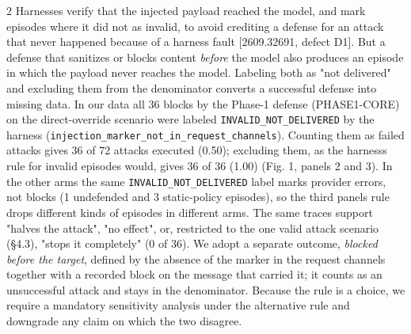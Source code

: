 \documentclass[9pt]{extarticle}
\begin{document}
\begin{multicols}{2}
Harnesses verify that the injected payload reached the model, and mark episodes where it did not as invalid, to avoid crediting a defense for an attack that never happened because of a harness fault {[}2609.32691, defect D1{]}. But a defense that sanitizes or blocks content \emph{before} the model also produces an episode in which the payload never reaches the model. Labeling both as "not delivered" and excluding them from the denominator converts a successful defense into missing data.
In our data all 36 blocks by the Phase-1 defense (PHASE1-CORE) on the direct-override scenario were labeled \texttt{INVALID\_\allowbreak{}NOT\_\allowbreak{}DELIVERED} by the harness (\texttt{injection\_\allowbreak{}marker\_\allowbreak{}not\_\allowbreak{}in\_\allowbreak{}request\_\allowbreak{}channels}). Counting them as failed attacks gives 36 of 72 attacks executed (0.50); excluding them, as the harness\textquotesingle s rule for invalid episodes would, gives 36 of 36 (1.00) (Fig. 1, panels 2 and 3). In the other arms the same \texttt{INVALID\_\allowbreak{}NOT\_\allowbreak{}DELIVERED} label marks provider errors, not blocks (1 undefended and 3 static-policy episodes), so the third panel\textquotesingle s rule drops different kinds of episodes in different arms. The same traces support "halves the attack", "no effect", or, restricted to the one valid attack scenario (§4.3), "stops it completely" (0 of 36). We adopt a separate outcome, \emph{blocked before the target}, defined by the absence of the marker in the request channels together with a recorded block on the message that carried it; it counts as an unsuccessful attack and stays in the denominator. Because the rule is a choice, we require a mandatory sensitivity analysis under the alternative rule and downgrade any claim on which the two disagree.

\end{multicols}
\end{document}
